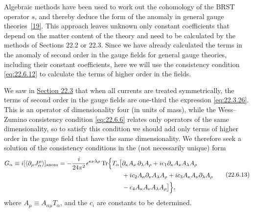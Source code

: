 Algebraic methods have been used to work out the cohomology of the BRST
operator $s$, and thereby deduce the form of the anomaly in general gauge
theories~\hyperref[ch22-ref-19]{[19]}. This approach leaves unknown only
constant coefficients that depend on the matter content of the theory and
need to be calculated by the methods of Sections 22.2 or 22.3. Since we
have already calculated the terms in the anomaly of second order in the
gauge fields for general gauge theories, including their constant
coefficients, here we will use the
consistency condition \eqref{eq:22.6.12} to calculate the terms of higher
order in the fields.

We saw in \hyperref[sec:22.3]{Section 22.3} that when all currents are
treated symmetrically, the terms of second order in the gauge fields are
one-third the expression \eqref{eq:22.3.26}. This is an operator of
dimensionality four (in units of mass), while the Wess--Zumino consistency
condition \eqref{eq:22.6.6} relates only operators of the same
dimensionality, so to satisfy this condition we should add only terms of
higher order in the gauge field that have the same dimensionality. We
therefore seek a solution of the consistency conditions in the (not
necessarily unique) form
\begin{equation}
 \begin{aligned}
 G_\alpha
 \equiv i[\langle\partial_\mu J^\mu_\alpha\rangle]_{\rm anom}
 =-\frac{i}{24\pi^2}\epsilon^{\kappa\nu\lambda\rho}
 \operatorname{Tr}\Bigl\{T_\alpha\bigl[
 &\partial_\kappa A_\nu\,\partial_\lambda A_\rho
 +ic_1\partial_\kappa A_\nu A_\lambda A_\rho
 \\
 &+ic_2A_\kappa\partial_\nu A_\lambda A_\rho
 +ic_3A_\kappa A_\nu\partial_\lambda A_\rho
 \\
 &-c_4A_\kappa A_\nu A_\lambda A_\rho
 \bigr]\Bigr\},
 \end{aligned}
 \tag{22.6.13}\label{eq:22.6.13}
\end{equation}
where $A_\mu\equiv A_{\alpha\mu}T_\alpha$, and the $c_i$ are constants to
be determined.

